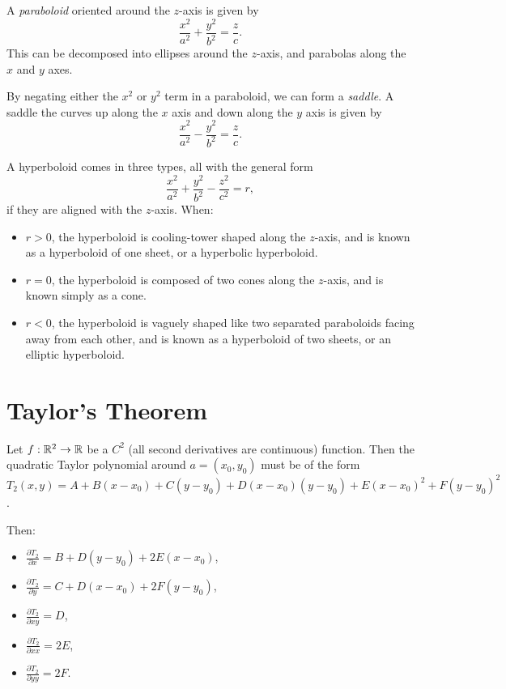 \begin{defn}
    A \emph{paraboloid} oriented around the $z$-axis is given by \[\frac{x^2}{a^2} + \frac{y^2}{b^2} = \frac{z}{c}.\] This can be decomposed into ellipses around the $z$-axis, and parabolas along the $x$ and $y$ axes.
\end{defn}

\begin{defn}
    By negating either the $x^2$ or $y^2$ term in a paraboloid, we can form a \emph{saddle}. A saddle the curves up along the $x$ axis and down along the $y$ axis is given by \[\frac{x^2}{a^2} - \frac{y^2}{b^2} = \frac{z}{c}.\]
\end{defn}

\begin{defn}
    A hyperboloid comes in three types, all with the general form \[\frac{x^2}{a^2} + \frac{y^2}{b^2} - \frac{z^2}{c^2} = r,\] if they are aligned with the $z$-axis. When:
    \begin{itemize}
        \item $r > 0$, the hyperboloid is cooling-tower shaped along the $z$-axis, and is known as a hyperboloid of one sheet, or a hyperbolic hyperboloid.
        \item $r = 0$, the hyperboloid is composed of two cones along the $z$-axis, and is known simply as a cone.
        \item $r < 0$, the hyperboloid is vaguely shaped like two separated paraboloids facing away from each other, and is known as a hyperboloid of two sheets, or an elliptic hyperboloid.
    \end{itemize}
\end{defn}

\section{Taylor's Theorem}

Let $f: \mathbb{R}^2 \to \mathbb{R}$ be a $C^2$ (all second derivatives are continuous) function. Then the quadratic Taylor polynomial around $a = (x_0, y_0)$ must be of the form $T_2(x, y) = A + B(x-x_0) + C(y-y_0) + D(x-x_0)(y-y_0) + E(x-x_0)^2 + F(y-y_0)^2$.

Then:
\begin{itemize}
    \item $\frac{\partial T_2}{\partial x} = B + D(y-y_0) + 2E(x-x_0)$,
    \item $\frac{\partial T_2}{\partial y} = C + D(x-x_0) + 2F(y-y_0)$,
    \item $\frac{\partial T_2}{\partial xy} = D$,
    \item $\frac{\partial T_2}{\partial xx} = 2E$,
    \item $\frac{\partial T_2}{\partial yy} = 2F$.
\end{itemize}

